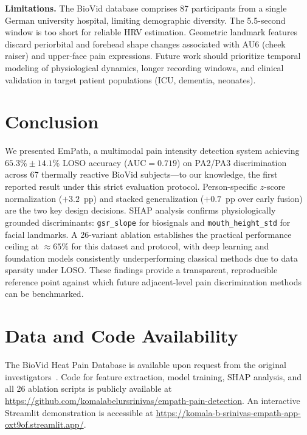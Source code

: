 \documentclass[sigconf]{acmart}
\begin{document}
\textbf{Limitations.}
The BioVid database comprises 87 participants from a single German university
hospital, limiting demographic diversity. The 5.5-second window is too short
for reliable HRV estimation. Geometric landmark features discard periorbital
and forehead shape changes associated with AU6 (cheek raiser) and upper-face
pain expressions. Future work should prioritize temporal modeling of
physiological dynamics, longer recording windows, and clinical validation in
target patient populations (ICU, dementia, neonates).

\section{Conclusion}
\label{sec:conclusion}

We presented EmPath, a multimodal pain intensity detection system achieving
$65.3\% \pm 14.1\%$ LOSO accuracy ($\text{AUC} = 0.719$) on PA2/PA3
discrimination across 67 thermally reactive BioVid subjects---to our knowledge,
the first reported result under this strict evaluation protocol. Person-specific
$z$-score normalization ($+3.2$~pp) and stacked generalization
($+0.7$~pp over early fusion) are the two key design decisions. SHAP analysis
confirms physiologically grounded discriminants: \texttt{gsr\_slope} for
biosignals and \texttt{mouth\_height\_std} for facial landmarks. A 26-variant
ablation establishes the practical performance ceiling at $\approx 65\%$ for
this dataset and protocol, with deep learning and foundation models
consistently underperforming classical methods due to data sparsity under LOSO.
These findings provide a transparent, reproducible reference point against
which future adjacent-level pain discrimination methods can be benchmarked.

\section*{Data and Code Availability}

The BioVid Heat Pain Database is available upon request from the original
investigators~\cite{walter2013}. Code for feature extraction, model training,
SHAP analysis, and all 26 ablation scripts is publicly available at
\url{https://github.com/komalabelursrinivas/empath-pain-detection}.
An interactive Streamlit demonstration is accessible at
\url{https://komala-b-srinivas-empath-app-oxt9of.streamlit.app/}.
\end{document}
